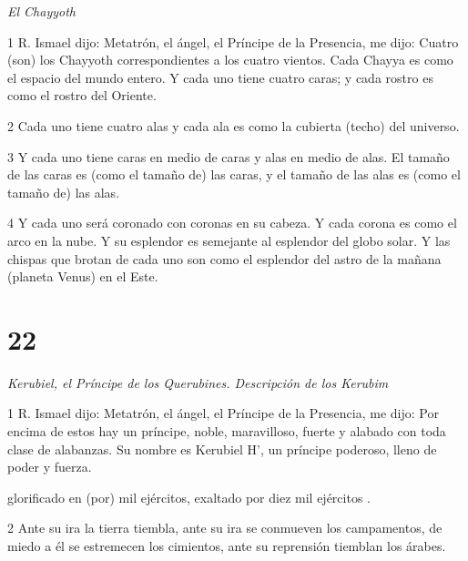 \par \textit{El Chayyoth}

\par 1 R. Ismael dijo: Metatrón, el ángel, el Príncipe de la Presencia, me dijo: Cuatro (son) los Chayyoth correspondientes a los cuatro vientos. Cada Chayya es como el espacio del mundo entero. Y cada uno tiene cuatro caras; y cada rostro es como el rostro del Oriente.

\par 2 Cada uno tiene cuatro alas y cada ala es como la cubierta (techo) del universo.

\par 3 Y cada uno tiene caras en medio de caras y alas en medio de alas. El tamaño de las caras es (como el tamaño de) las caras, y el tamaño de las alas es (como el tamaño de) las alas.

\par 4 Y cada uno será coronado con coronas en su cabeza. Y cada corona es como el arco en la nube. Y su esplendor es semejante al esplendor del globo solar. Y las chispas que brotan de cada uno son como el esplendor del astro de la mañana (planeta Venus) en el Este.

\chapter{22}

\par \textit{Kerubiel, el Príncipe de los Querubines. Descripción de los Kerubim}

\par 1 R. Ismael dijo: Metatrón, el ángel, el Príncipe de la Presencia, me dijo: Por encima de estos hay un príncipe, noble, maravilloso, fuerte y alabado con toda clase de alabanzas. Su nombre es Kerubiel H', un príncipe poderoso, lleno de poder y fuerza.

\par [AD: un príncipe de alteza, y la Alteza (está) con él, un príncipe justo, y la justicia (está) con él, un príncipe santo, y la santidad (está) con él, un príncipe] [B: un príncipe de alteza, y con él (hay) un príncipe justo, de justicia, y con él un príncipe santo, de santidad, y con él (hay) un príncipe ] glorificado en (por) mil ejércitos, exaltado por diez mil ejércitos .

\par 2 Ante su ira la tierra tiembla, ante su ira se conmueven los campamentos, de miedo a él se estremecen los cimientos, ante su reprensión tiemblan los árabes.

